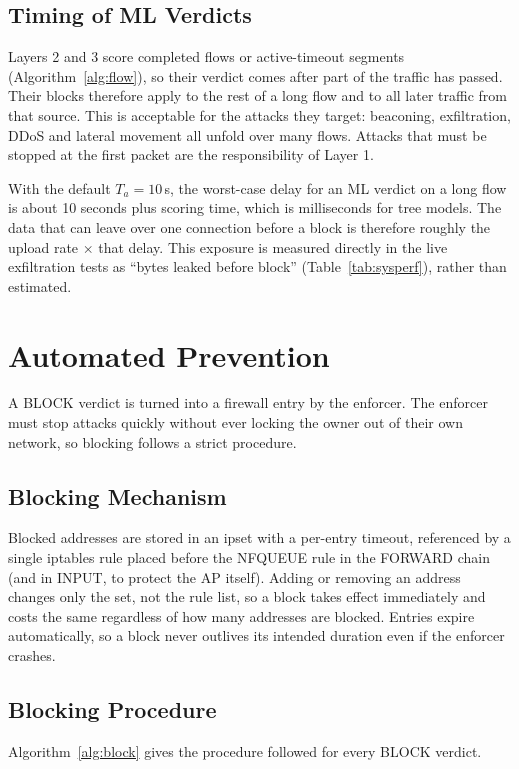 \subsection{Timing of ML Verdicts}\label{sec:5.7.3}
\label{sec:mltiming}
\noindent Layers 2 and 3 score completed flows or active-timeout segments (Algorithm~\ref{alg:flow}), so their verdict comes after part of the traffic has passed. Their blocks therefore apply to the rest of a long flow and to all later traffic from that source. This is acceptable for the attacks they target: beaconing, exfiltration, DDoS and lateral movement all unfold over many flows. Attacks that must be stopped at the first packet are the responsibility of Layer 1.

\noindent With the default $T_a = 10$\,s, the worst-case delay for an ML verdict on a long flow is about 10 seconds plus scoring time, which is milliseconds for tree models. The data that can leave over one connection before a block is therefore roughly the upload rate $\times$ that delay. This exposure is measured directly in the live exfiltration tests as ``bytes leaked before block'' (Table~\ref{tab:sysperf}), rather than estimated.

\section{Automated Prevention}\label{sec:5.8}
\label{sec:prevention}
\noindent A BLOCK verdict is turned into a firewall entry by the enforcer. The enforcer must stop attacks quickly without ever locking the owner out of their own network, so blocking follows a strict procedure.

\subsection{Blocking Mechanism}\label{sec:5.8.1}
\label{sec:blockmech}
\noindent Blocked addresses are stored in an ipset with a per-entry timeout, referenced by a single iptables rule placed before the NFQUEUE rule in the FORWARD chain (and in INPUT, to protect the AP itself). Adding or removing an address changes only the set, not the rule list, so a block takes effect immediately and costs the same regardless of how many addresses are blocked. Entries expire automatically, so a block never outlives its intended duration even if the enforcer crashes.

\subsection{Blocking Procedure}\label{sec:5.8.2}
\label{sec:blockproc}
\noindent Algorithm~\ref{alg:block} gives the procedure followed for every BLOCK verdict.

